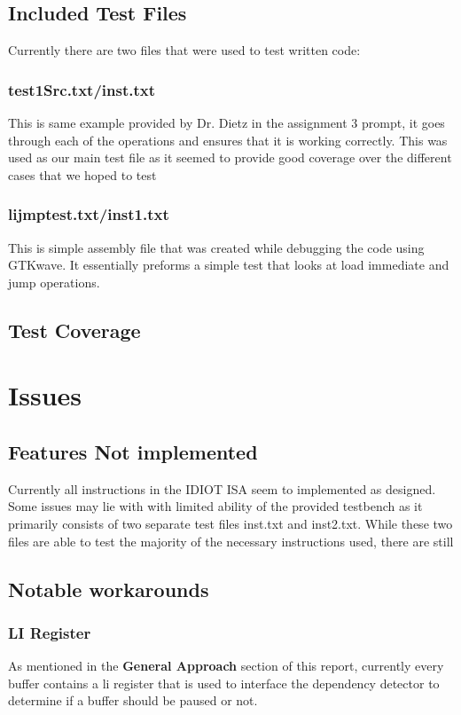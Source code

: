 \documentclass[conference]{IEEEtran}
\begin{document}
\subsection{Included Test Files}
Currently there are two files that were used to test written code:
\subsubsection{test1Src.txt/inst.txt}
This is same example provided by Dr. Dietz in the assignment 3 prompt, it goes through
each of the operations and ensures that it is working correctly. This was used as our main 
test file as it seemed to provide good coverage over the different cases that we hoped to test

\subsubsection{lijmptest.txt/inst1.txt}
This is simple assembly file that was created while debugging the code using GTKwave. It essentially preforms a simple test  that looks at load immediate and jump operations.

\subsection{Test Coverage}

\section{Issues}
\subsection{Features Not implemented}
Currently all instructions in the IDIOT ISA seem to implemented as
designed. Some issues may lie with with limited ability of the provided testbench as 
it primarily consists of two separate test files inst.txt and inst2.txt.  While these two
files are able to test the majority of the necessary instructions used, there are still 

\subsection{Notable workarounds}
\subsubsection{LI Register }
As mentioned in the \textbf{General Approach} section of this report, currently 
every buffer contains a li register that is used to interface the dependency detector
to determine if a buffer should be paused or not. 
\end{document}
